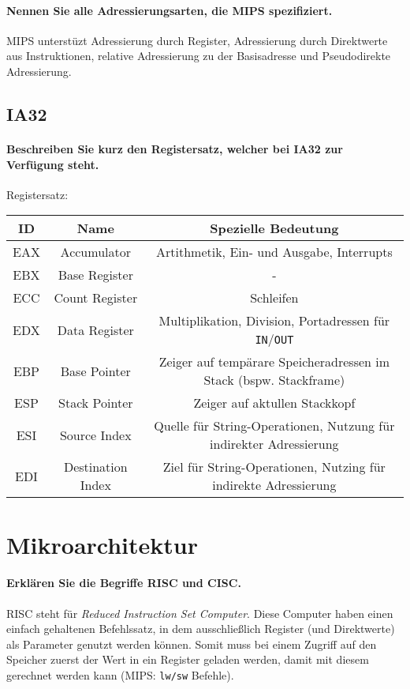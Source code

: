             \paragraph{Nennen Sie alle Adressierungsarten, die MIPS spezifiziert.}
                MIPS unterstüzt Adressierung durch Register, Adressierung durch Direktwerte aus Instruktionen, relative Adressierung zu der Basisadresse und Pseudodirekte Adressierung.

        \subsection{IA32}
            \paragraph{Beschreiben Sie kurz den Registersatz, welcher bei IA32 zur Verfügung steht.}
                Registersatz: \\
                \begin{tabular}{c | c | c}
                    ID & Name & Spezielle Bedeutung \\
                    \hline
                    EAX & Accumulator & Artithmetik, Ein- und Ausgabe, Interrupts \\
                    EBX & Base Register & - \\
                    ECC & Count Register & Schleifen \\
                    EDX & Data Register & Multiplikation, Division, Portadressen für \texttt{IN}/\texttt{OUT} \\
                    EBP & Base Pointer & Zeiger auf tempärare Speicheradressen im Stack (bspw. Stackframe) \\
                    ESP & Stack Pointer & Zeiger auf aktullen Stackkopf \\
                    ESI & Source Index & Quelle für String-Operationen, Nutzung für indirekter Adressierung \\
                    EDI & Destination Index & Ziel für String-Operationen, Nutzing für indirekte Adressierung \\
                \end{tabular}

    \section{Mikroarchitektur}
        \paragraph{Erklären Sie die Begriffe RISC und CISC.}
            RISC steht für \textit{Reduced Instruction Set Computer}. Diese Computer haben einen einfach gehaltenen Befehlssatz, in dem ausschließlich Register (und Direktwerte) als Parameter genutzt werden können. Somit muss bei einem Zugriff auf den Speicher zuerst der Wert in ein Register geladen werden, damit mit diesem gerechnet werden kann (MIPS: \texttt{lw/sw} Befehle).

